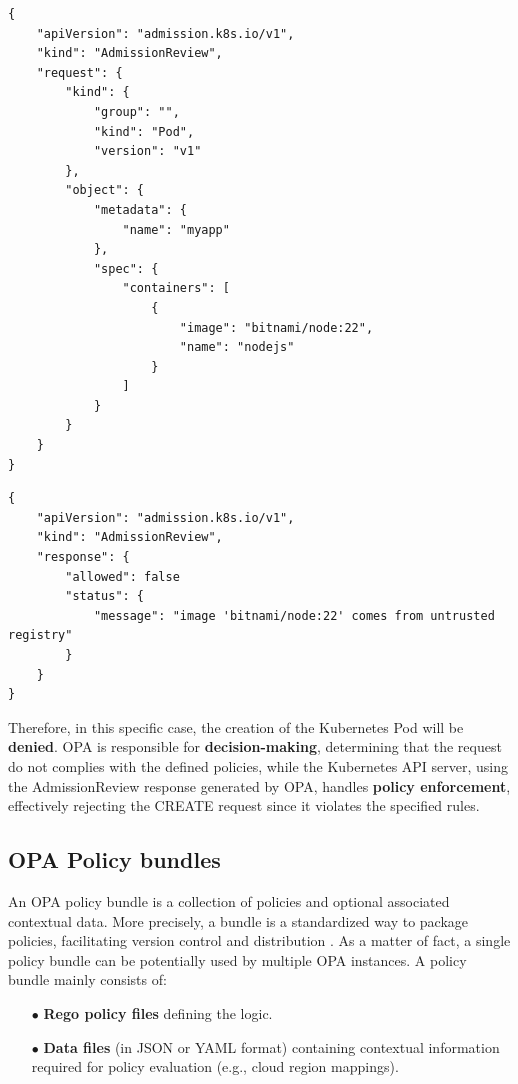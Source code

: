 \newpage
\lstset{style=jsonstyle}
\begin{lstlisting}[caption={AdmissionReview request}]
{
    "apiVersion": "admission.k8s.io/v1",
    "kind": "AdmissionReview",
    "request": {
        "kind": {
            "group": "",
            "kind": "Pod",
            "version": "v1"
        },
        "object": {
            "metadata": {
                "name": "myapp"
            },
            "spec": {
                "containers": [
                    {
                        "image": "bitnami/node:22",
                        "name": "nodejs"
                    }
                ]
            }
        }
    }
}
\end{lstlisting}

\lstset{style=jsonstyle}
\begin{lstlisting}[caption={AdmissionReview response}]
{
    "apiVersion": "admission.k8s.io/v1",
    "kind": "AdmissionReview",
    "response": {
        "allowed": false
        "status": {
            "message": "image 'bitnami/node:22' comes from untrusted registry"
        }
    }
}
\end{lstlisting}

Therefore, in this specific case, the creation of the Kubernetes Pod will be \textbf{denied}. OPA is responsible for \textbf{decision-making}, determining that the request do not complies with the defined policies, while the Kubernetes API server, using the AdmissionReview response generated by OPA, handles \textbf{policy enforcement}, effectively rejecting the CREATE request since it violates the specified rules.

\subsection{OPA Policy bundles}
\label{sec:opa_bundles}

An OPA policy bundle is a collection of policies and optional associated contextual data. More precisely, a bundle is a standardized way to package policies, facilitating version control and distribution \cite{opa_bundles}. As a matter of fact, a single policy bundle can be potentially used by multiple OPA instances.
A policy bundle mainly consists of:
\begin{itemize}[itemsep=0.2pt, topsep=1pt]
  \item[$\bullet$] \textbf{Rego policy files} defining the logic.
  \item[$\bullet$] \textbf{Data files} (in JSON or YAML format) containing contextual information required for policy evaluation (e.g., cloud region mappings).
\end{itemize} 


